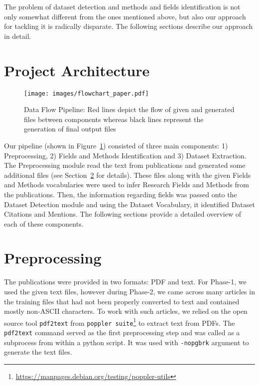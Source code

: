 \documentclass[runningheads]{llncs}
\begin{document}
The problem of dataset detection and methods and fields identification is not only somewhat different from the ones mentioned above, but also our approach for tackling it is radically disparate. The following sections describe our approach in detail.

\section{Project Architecture}

\begin{figure}[!htb]
    \centering
    \texttt{[image: images/flowchart\_paper.pdf]}
    \caption{Data Flow Pipeline: Red lines depict the flow of given and generated files between components whereas black lines represent the generation of final output files}
    \label{fig:flowchart}
\end{figure}

Our pipeline (shown in Figure~\ref{fig:flowchart}) consisted of three main components: 1) Preprocessing, 2) Fields and Methods Identification and 3) Dataset Extraction. The Preprocessing module read the text from publications and generated some additional files (see Section~\ref{preprocess} for details). These files along with the given Fields and Methods vocabularies were used to infer Research Fields and Methods from the publications. Then, the information regarding fields was passed onto the Dataset Detection module and using the Dataset Vocabulary, it identified Dataset Citations and Mentions. The following sections provide a detailed overview of each of these components.

\section{Preprocessing} \label{preprocess}

The publications were provided in two formats: PDF and text. %
For Phase-1, we used the given text files, however during Phase-2, we came across many articles in the training files that had not been properly converted to text and contained mostly non-ASCII characters. To work with such articles, we relied on the open source tool \texttt{pdf2text} from \texttt{poppler suite}\footnote{\label{poppler}\url{https://manpages.debian.org/testing/poppler-utils}} to extract text from PDFs. The \texttt{pdf2text} command served as the first preprocessing step and was called as a subprocess from within a python script. It was used with \texttt{-nopgbrk} argument to generate the text files.
\end{document}
